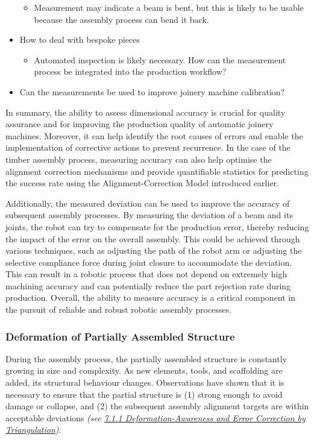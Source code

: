 \documentclass[11pt]{book}
\begin{document}
\begin{itemize}
\begin{itemize}
	\item Measurement may indicate a beam is bent, but this is likely to be usable because the assembly process can bend it back.

\end{itemize}
	\item How to deal with bespoke pieces

\begin{itemize}
	\item Automated inspection is likely necessary. How can the measurement process be integrated into the production workflow?

\end{itemize}
	\item Can the measurements be used to improve joinery machine calibration?

\end{itemize}
In summary, the ability to assess dimensional accuracy is crucial for quality assurance and for improving the production quality of automatic joinery machines. Moreover, it can help identify the root causes of errors and enable the implementation of corrective actions to prevent recurrence. In the case of the timber assembly process, measuring accuracy can also help optimise the alignment correction mechanisms and provide quantifiable statistics for predicting the success rate using the Alignment-Correction Model introduced earlier.

Additionally, the measured deviation can be used to improve the accuracy of subsequent assembly processes. By measuring the deviation of a beam and its joints, the robot can try to compensate for the production error, thereby reducing the impact of the error on the overall assembly. This could be achieved through various techniques, such as adjusting the path of the robot arm or adjusting the selective compliance force during joint closure to accommodate the deviation. This can result in a robotic process that does not depend on extremely high machining accuracy and can potentially reduce the part rejection rate during production. Overall, the ability to measure accuracy is a critical component in the pursuit of reliable and robust robotic assembly processes.

\subsubsection{Deformation of Partially Assembled Structure}

During the assembly process, the partially assembled structure is constantly growing in size and complexity. As new elements, tools, and scaffolding are added, its structural behaviour changes. Observations have shown that it is necessary to ensure that the partial structure is (1) strong enough to avoid damage or collapse, and (2) the subsequent assembly alignment targets are within acceptable deviations \textit{(see \uline{7.1.1 Deformation-Awareness and Error Correction by Triangulation})}. 
\end{document}

